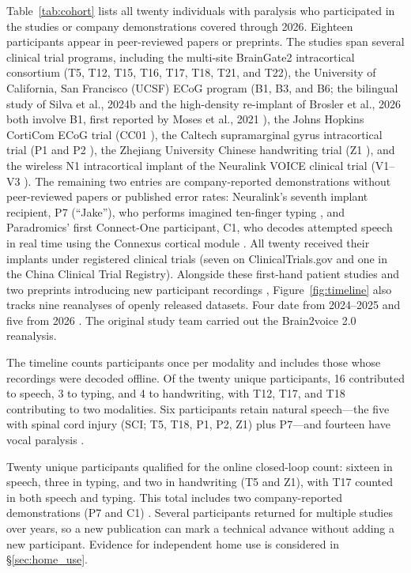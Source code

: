\documentclass[11pt]{article}
\begin{document}
Table~\ref{tab:cohort} lists all twenty individuals with paralysis who
participated in the studies or company demonstrations covered through
2026. Eighteen participants appear in peer-reviewed papers or preprints.
The studies span several clinical trial programs, including the multi-site BrainGate2 intracortical consortium (T5, T12,
T15, T16, T17, T18, T21, and T22), the University of California, San
Francisco (UCSF) ECoG program (B1, B3, and B6; the bilingual study of
Silva et al., 2024b \cite{silva2024} and the high-density re-implant of
Brosler et al., 2026 \cite{brosler2026} both involve B1, first reported
by Moses et al., 2021 \cite{moses2021}), the Johns Hopkins CortiCom ECoG
trial (CC01 \cite{angrick2024, luo2023}), the Caltech supramarginal gyrus
intracortical trial (P1 and P2 \cite{wandelt2024}), the Zhejiang
University Chinese handwriting trial (Z1 \cite{xu2025, yang2026}), and the
wireless N1 intracortical implant of the Neuralink VOICE clinical trial
(V1--V3 \cite{pouratian2026}). The remaining two entries are
company-reported demonstrations without peer-reviewed papers or published
error rates: Neuralink's seventh implant recipient, P7 (``Jake''), who
performs imagined ten-finger typing \cite{neuralink2026, schneider2025},
and Paradromics' first Connect-One participant, C1, who decodes
attempted speech in real time using the Connexus cortical module
\cite{perkins2025, paradromics2026}. All twenty received their implants
under registered clinical trials (seven on ClinicalTrials.gov and one in
the China Clinical Trial Registry). Alongside these first-hand patient
studies and two preprints introducing new participant recordings
\cite{yoon2026, levin2026}, Figure~\ref{fig:timeline} also tracks nine
reanalyses of openly released datasets. Four date from 2024--2025
\cite{feng2024, falcon2024, li2025dcond, feghhi2025} and five from 2026
\cite{wairagkar2026, boccato2026, align2026, bit2026, feghhi2026}.
The original study team carried out the Brain2voice 2.0 reanalysis.

The timeline counts participants once per modality and includes those
whose recordings were decoded offline. Of the twenty unique
participants, 16 contributed to speech, 3 to typing, and 4 to handwriting,
with T12, T17, and T18 contributing to two modalities. Six participants
retain natural speech---the five with spinal cord injury (SCI; T5, T18,
P1, P2, Z1) plus P7---and fourteen have vocal paralysis
\cite{silva2024review}.

Twenty unique participants qualified for the online closed-loop count:
sixteen in speech, three in typing, and two in handwriting (T5 and Z1),
with T17 counted in both speech and typing. This total includes two
company-reported demonstrations (P7 and C1)
\cite{neuralink2026, paradromics2026}. Several participants returned for
multiple studies over years, so a new publication can mark a technical
advance without adding a new participant. Evidence for independent home
use is considered in \S\ref{sec:home_use}.
\end{document}
